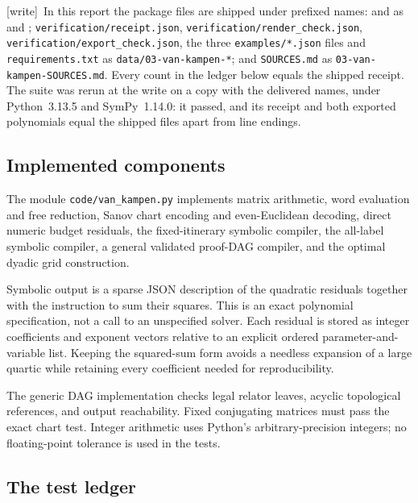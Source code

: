 \documentclass[11pt,letterpaper]{article}
\theoremstyle{definition}
\theoremstyle{remark}
\newcommand{\wtag}{\textup{[write]}}
\begin{document}
\wtag\ In this report the package files are shipped under prefixed names:  and  as  and ; \texttt{verification/receipt.json}, \texttt{verification/render\_check.json}, \texttt{verification/export\_check.json}, the three \texttt{examples/*.json} files and \texttt{requirements.txt} as \texttt{data/03-van-kampen-*}; and \texttt{SOURCES.md} as \texttt{03-van-kampen-SOURCES.md}. Every count in the ledger below equals the shipped receipt. The suite was rerun at the write on a copy with the delivered names, under Python~3.13.5 and SymPy~1.14.0: it passed, and its receipt and both exported polynomials equal the shipped files apart from line endings.

\subsection{Implemented components}

The module \texttt{code/van\_kampen.py} implements matrix arithmetic, word evaluation and free reduction, Sanov chart encoding and even-Euclidean decoding, direct numeric budget residuals, the fixed-itinerary symbolic compiler, the all-label symbolic compiler, a general validated proof-DAG compiler, and the optimal dyadic grid construction.

Symbolic output is a sparse JSON description of the quadratic residuals together with the instruction to sum their squares. This is an exact polynomial specification, not a call to an unspecified solver. Each residual is stored as integer coefficients and exponent vectors relative to an explicit ordered parameter-and-variable list. Keeping the squared-sum form avoids a needless expansion of a large quartic while retaining every coefficient needed for reproducibility.

The generic DAG implementation checks legal relator leaves, acyclic topological references, and output reachability. Fixed conjugating matrices must pass the exact chart test. Integer arithmetic uses Python's arbitrary-precision integers; no floating-point tolerance is used in the tests.

\subsection{The test ledger}
\end{document}
